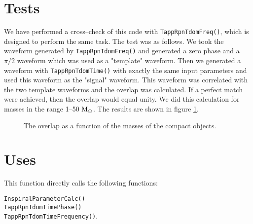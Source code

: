 \documentclass[12pt]{article}
\begin{document}
\section{Tests}

We have performed a cross--check of this code with \texttt{TappRpnTdomFreq()}, which is designed to perform the same task. The test was as follows. We took the waveform generated by \texttt{TappRpnTdomFreq()} and generated a zero phase and a $\pi/2$ waveform which was used as a "template" waveform. Then we generated a waveform with \texttt{TappRpnTdomTime()} with exactly the same input parameters and used this waveform as the "signal" waveform. This waveform was correlated with the two template waveforms and the overlap was calculated. If a perfect match were achieved, then the overlap would equal unity. We did this calculation for masses in the range 1--50 $\rm{M_{\odot}}$. The results are shown in figure \ref{overlap1}.

\begin{figure}
\begin{center}
\caption{The overlap as a function of the masses of the compact objects.}
\label{overlap1}
\end{center}
\end{figure}




\section{Uses}

This function directly calls the following functions:

\vspace{5mm}

\noindent
\texttt{InspiralParameterCalc()} \\
\texttt{TappRpnTdomTimePhase()} \\
\texttt{TappRpnTdomTimeFrequency()}. \\
\end{document}
